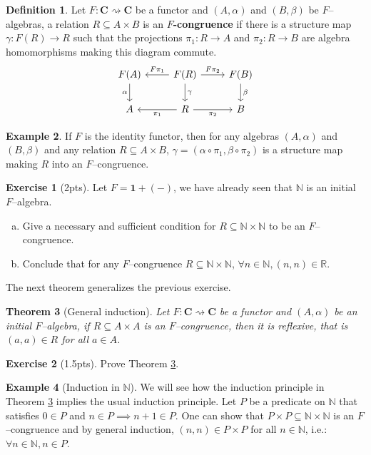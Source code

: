 \documentclass{article}
\newtheorem{thm}{Theorem}
\theoremstyle{definition}
\newtheorem{defn}[thm]{Definition}
\newtheorem{exmp}[thm]{Example}
\newtheorem{exer}{Exercise}
\theoremstyle{remark}
\newcommand{\R}{\mathbb{R}}
\newcommand{\N}{\mathbb{N}}
\begin{document}
\begin{defn}
	Let $F:\mathbf{C}\rightsquigarrow \mathbf{C}$ be a functor and $(A,\alpha)$ and $(B, \beta)$ be $F$--algebras, a relation $R \subseteq A \times B$ is an $F$\textbf{-congruence} if there is a structure map $\gamma:F(R) \rightarrow R$ such that the projections $\pi_1:R\rightarrow A$ and $\pi_2:R \rightarrow B$ are algebra homomorphisms making this diagram commute.
	\begin{equation}\label{diag-congruence}
		\centering
		\begin{tikzcd}
			F(A) \arrow[d, "\alpha"'] & F(R) \arrow[d, "\gamma"] \arrow[l, "F\pi_1"'] \arrow[r, "F\pi_2"] & F(B) \arrow[d, "\beta"] \\
			A                         & R \arrow[r, "\pi_2"'] \arrow[l, "\pi_1"]                          & B                      
		\end{tikzcd}
	\end{equation}
\end{defn}
\begin{exmp}
	If $F$ is the identity functor, then for any algebras $(A, \alpha)$ and $(B, \beta)$ and any relation $R \subseteq A\times B$, $\gamma = (\alpha \circ \pi_1, \beta \circ \pi_2)$ is a structure map making $R$ into an $F$--congruence.
\end{exmp}
\begin{exer}[2pts]
    Let $F = \mathbf{1} + (-)$, we have already seen that $\N$ is an initial $F$--algebra.
    \begin{enumerate}[(a)]
        \item Give a necessary and sufficient condition for $R \subseteq \N \times \N$ to be an $F$--congruence.
        \item Conclude that for any $F$--congruence $R \subseteq \N\times \N$, $\forall n \in \N, (n,n) \in \R$.
    \end{enumerate}
\end{exer}
The next theorem generalizes the previous exercise.
\begin{thm}[General induction]\label{induction} Let $F:\mathbf{C}\rightsquigarrow \mathbf{C}$ be a functor and $(A, \alpha)$ be an initial $F$--algebra, if $R\subseteq A\times A$ is an $F$--congruence, then it is reflexive, that is $(a,a) \in R$ for all $a \in A$.
\end{thm}
\begin{exer}[1.5pts]
    Prove Theorem \ref{induction}.
\end{exer}
\begin{exmp}[Induction in $\N$]
	We will see how the induction principle in Theorem \ref{induction} implies the usual induction principle. Let $P$ be a predicate on $\N$ that satisfies $0 \in P$ and $n\in P \implies n+1 \in P$. One can show that $P\times P \subseteq \N\times \N$ is an $F$--congruence and by general induction, $(n,n) \in P \times P$ for all $n \in \N$, i.e.: $\forall n\in \N, n \in P$.
\end{exmp}
\end{document}
